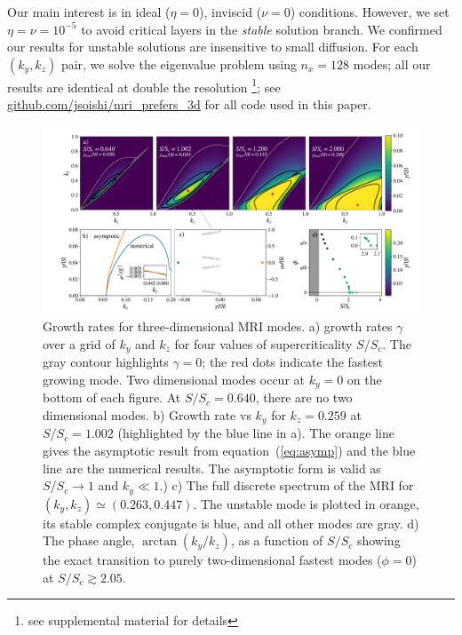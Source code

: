 \documentclass[aps,prl,reprint,superscriptaddress]{revtex4-1}
\newcommand{\SSC}{S/S_{c}}
\begin{document}
Our main interest is in ideal ($\eta=0$), inviscid ($\nu=0$) conditions.
However, we set $\eta=\nu=10^{-5}$ to avoid critical layers in the \textit{stable} solution branch.
We confirmed our results for unstable solutions are insensitive to small diffusion. 
For each $(k_{y},k_{z})$ pair, we solve the eigenvalue problem using $n_{x}=128$ modes; all our results are identical at double the resolution \footnote{see supplemental material for details}; see \protect\url{github.com/jsoishi/mri_prefers_3d} for all code used in this paper.
\begin{figure}[ht]
  \includegraphics[width=\textwidth]{fig_1.pdf}
  \caption{Growth rates for three-dimensional MRI modes. 
  a) growth rates $\gamma$ over a grid of $k_{y}$ and $k_{z}$ for four values of supercriticality $\SSC$. 
  The gray contour highlights $\gamma=0$; the red dots indicate the fastest growing mode. 
Two dimensional modes occur at $k_y = 0$ on the bottom of each figure.
  At $\SSC=0.640$, there are no two dimensional modes. 
  b) Growth rate vs $k_{y}$ for $k_{z}=0.259$ at $\SSC=1.002$ (highlighted by the blue line in a). 
  The orange line gives the asymptotic result from equation~(\ref{eq:asymp}) and the blue line are the numerical results. 
  The asymptotic form is valid as $\SSC\to1$ and $k_{y}\ll1$.) c) The full discrete spectrum of the MRI for $(k_{y},k_{z})\simeq(0.263,0.447)$. 
  The unstable mode is plotted in orange, its stable complex conjugate is blue, and all other modes are gray. 
  d) The phase angle, $\arctan(k_{y}/k_{z})$, as a function of $\SSC$ showing the exact transition to purely two-dimensional fastest modes ($\phi=0$) at $\SSC\gtrsim2.05$. }
  \label{fig:growth_rate}
\end{figure}
\end{document}
